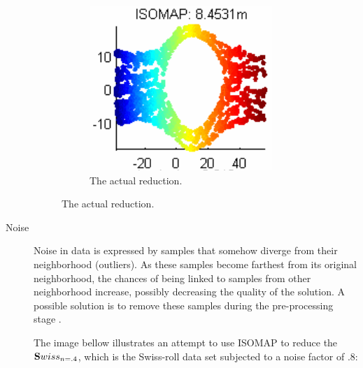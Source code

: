 \begin{description}
\begin{figure}[H]
		\begin{subfigure}[H]{.45\linewidth}
			\includegraphics[width=\linewidth]{img/convexity/actual.png}
			\captionsetup{justification=centering}
			\caption{The actual reduction.}
		\end{subfigure}
	\end{figure}

	\newpage
	\item[Noise] Noise in data is expressed by samples that somehow diverge from their neighborhood (outliers). As these samples become farthest from its original neighborhood, the chances of being linked to samples from other neighborhood increase, possibly decreasing the quality of the solution. A possible solution is to remove these samples during the pre-processing stage \cite{herik2009}.

	The image bellow illustrates an attempt to use ISOMAP to reduce the $\mathbf{S}wiss_{n=.4}$, which is the Swiss-roll data set subjected to a noise factor of $.8$:


\end{description}

